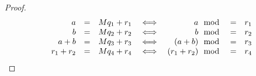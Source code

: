\begin{lemma}
\end{lemma}
\begin{proof}
\[
\begin{array}{rclcrcl}
  a       &=& Mq_1 + r_1   &\iff& a        \mod &=& r_1   \\
  b       &=& Mq_2 + r_2   &\iff& b        \mod &=& r_2   \\
  a+b     &=& Mq_3 + r_3   &\iff& (a+b)    \mod &=& r_3   \\
  r_1+r_2 &=& Mq_4 + r_4   &\iff& (r_1+r_2)\mod &=& r_4
\end{array}
\]
\end{proof}

